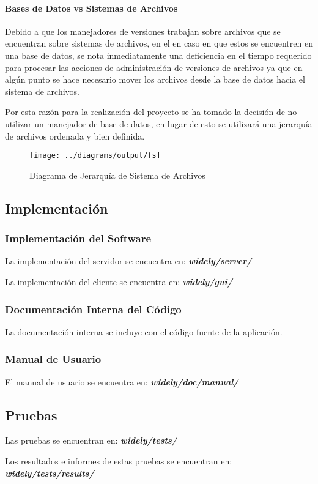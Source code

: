\paragraph{Bases de Datos vs Sistemas de Archivos}

Debido a que los manejadores de versiones trabajan sobre archivos que se encuentran sobre sistemas de archivos, en el en caso en que estos se encuentren en una base de datos, se nota inmediatamente una deficiencia en el tiempo requerido para procesar las acciones de administración de versiones de archivos ya que en algún punto se hace necesario mover los archivos desde la base de datos hacia el sistema de archivos.

Por esta razón para la realización del proyecto se ha tomado la decisión de no utilizar un manejador de base de datos, en lugar de esto se utilizará una jerarquía de archivos ordenada y bien definida.


\begin{figure}
 \centering
 \texttt{[image: ../diagrams/output/fs]}
 \caption{Diagrama de Jerarquía de Sistema de Archivos}
 \label{diagrama:fs}
\end{figure}


\newpage

\subsection{Implementación}


\subsubsection{Implementación del Software}

La implementación del servidor se encuentra en: \textit{\textbf{widely/server/}}

La implementación del cliente se encuentra en: \textit{\textbf{widely/gui/}}


\subsubsection{Documentación Interna del Código}

La documentación interna se incluye con el código fuente de la aplicación.


\subsubsection{Manual de Usuario}

El manual de usuario se encuentra en: \textit{\textbf{widely/doc/manual/}}


\subsection{Pruebas}

Las pruebas se encuentran en: \textit{\textbf{widely/tests/}}

Los resultados e informes de estas pruebas se encuentran en: \textit{\textbf{widely/tests/results/}}

